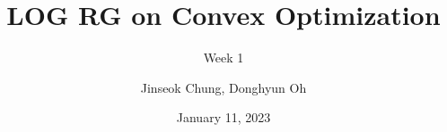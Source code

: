 \title{LOG RG on Convex Optimization}
\subtitle{Week 1}
\author{Jinseok Chung, Donghyun Oh}
\date{January 11, 2023} 
